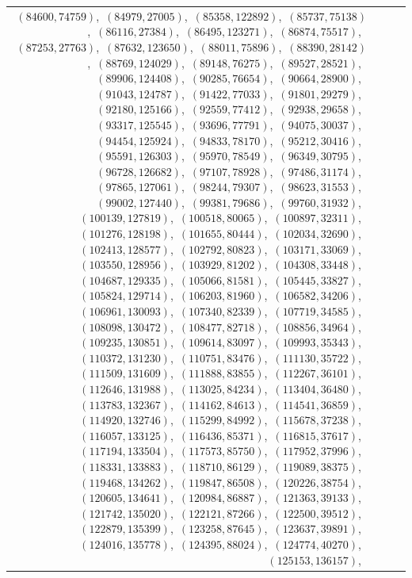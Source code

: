 \documentclass[11pt]{article}
\begin{document}
\begin{longtable}{@{}rrl>{\raggedright\arraybackslash}p{}@{}}
$(84600,74759)$,\allowbreak\ $(84979,27005)$,\allowbreak\ $(85358,122892)$,\allowbreak\ $(85737,75138)$,\allowbreak\ $(86116,27384)$,\allowbreak\ $(86495,123271)$,\allowbreak\ $(86874,75517)$,\allowbreak\ $(87253,27763)$,\allowbreak\ $(87632,123650)$,\allowbreak\ $(88011,75896)$,\allowbreak\ $(88390,28142)$,\allowbreak\ $(88769,124029)$,\allowbreak\ $(89148,76275)$,\allowbreak\ $(89527,28521)$,\allowbreak\ $(89906,124408)$,\allowbreak\ $(90285,76654)$,\allowbreak\ $(90664,28900)$,\allowbreak\ $(91043,124787)$,\allowbreak\ $(91422,77033)$,\allowbreak\ $(91801,29279)$,\allowbreak\ $(92180,125166)$,\allowbreak\ $(92559,77412)$,\allowbreak\ $(92938,29658)$,\allowbreak\ $(93317,125545)$,\allowbreak\ $(93696,77791)$,\allowbreak\ $(94075,30037)$,\allowbreak\ $(94454,125924)$,\allowbreak\ $(94833,78170)$,\allowbreak\ $(95212,30416)$,\allowbreak\ $(95591,126303)$,\allowbreak\ $(95970,78549)$,\allowbreak\ $(96349,30795)$,\allowbreak\ $(96728,126682)$,\allowbreak\ $(97107,78928)$,\allowbreak\ $(97486,31174)$,\allowbreak\ $(97865,127061)$,\allowbreak\ $(98244,79307)$,\allowbreak\ $(98623,31553)$,\allowbreak\ $(99002,127440)$,\allowbreak\ $(99381,79686)$,\allowbreak\ $(99760,31932)$,\allowbreak\ $(100139,127819)$,\allowbreak\ $(100518,80065)$,\allowbreak\ $(100897,32311)$,\allowbreak\ $(101276,128198)$,\allowbreak\ $(101655,80444)$,\allowbreak\ $(102034,32690)$,\allowbreak\ $(102413,128577)$,\allowbreak\ $(102792,80823)$,\allowbreak\ $(103171,33069)$,\allowbreak\ $(103550,128956)$,\allowbreak\ $(103929,81202)$,\allowbreak\ $(104308,33448)$,\allowbreak\ $(104687,129335)$,\allowbreak\ $(105066,81581)$,\allowbreak\ $(105445,33827)$,\allowbreak\ $(105824,129714)$,\allowbreak\ $(106203,81960)$,\allowbreak\ $(106582,34206)$,\allowbreak\ $(106961,130093)$,\allowbreak\ $(107340,82339)$,\allowbreak\ $(107719,34585)$,\allowbreak\ $(108098,130472)$,\allowbreak\ $(108477,82718)$,\allowbreak\ $(108856,34964)$,\allowbreak\ $(109235,130851)$,\allowbreak\ $(109614,83097)$,\allowbreak\ $(109993,35343)$,\allowbreak\ $(110372,131230)$,\allowbreak\ $(110751,83476)$,\allowbreak\ $(111130,35722)$,\allowbreak\ $(111509,131609)$,\allowbreak\ $(111888,83855)$,\allowbreak\ $(112267,36101)$,\allowbreak\ $(112646,131988)$,\allowbreak\ $(113025,84234)$,\allowbreak\ $(113404,36480)$,\allowbreak\ $(113783,132367)$,\allowbreak\ $(114162,84613)$,\allowbreak\ $(114541,36859)$,\allowbreak\ $(114920,132746)$,\allowbreak\ $(115299,84992)$,\allowbreak\ $(115678,37238)$,\allowbreak\ $(116057,133125)$,\allowbreak\ $(116436,85371)$,\allowbreak\ $(116815,37617)$,\allowbreak\ $(117194,133504)$,\allowbreak\ $(117573,85750)$,\allowbreak\ $(117952,37996)$,\allowbreak\ $(118331,133883)$,\allowbreak\ $(118710,86129)$,\allowbreak\ $(119089,38375)$,\allowbreak\ $(119468,134262)$,\allowbreak\ $(119847,86508)$,\allowbreak\ $(120226,38754)$,\allowbreak\ $(120605,134641)$,\allowbreak\ $(120984,86887)$,\allowbreak\ $(121363,39133)$,\allowbreak\ $(121742,135020)$,\allowbreak\ $(122121,87266)$,\allowbreak\ $(122500,39512)$,\allowbreak\ $(122879,135399)$,\allowbreak\ $(123258,87645)$,\allowbreak\ $(123637,39891)$,\allowbreak\ $(124016,135778)$,\allowbreak\ $(124395,88024)$,\allowbreak\ $(124774,40270)$,\allowbreak\ $(125153,136157)$,\allowbreak\ 
\end{longtable}
\end{document}

